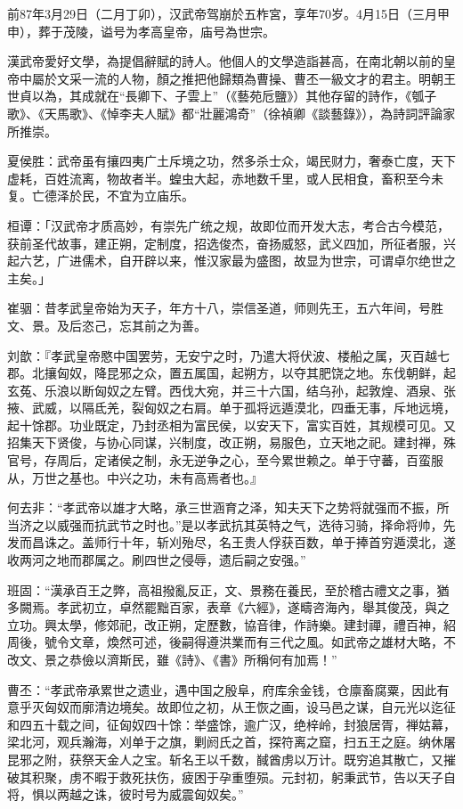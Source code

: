 前87年3月29日（二月丁卯），汉武帝驾崩於五柞宮，享年70岁。4月15日（三月甲申），葬于茂陵，谥号为孝高皇帝，庙号為世宗。

漢武帝愛好文學，為提倡辭賦的詩人。他個人的文學造詣甚高，在南北朝以前的皇帝中屬於文采一流的人物，顏之推把他歸類為曹操、曹丕一級文才的君主。明朝王世貞以為，其成就在“長卿下、子雲上”（《藝苑卮鹽》）其他存留的詩作，《瓠子歌》、《天馬歌》、《悼李夫人賦》都“壯麗鴻奇”（徐禎卿《談藝錄》），為詩詞評論家所推崇。

夏侯胜：武帝虽有攘四夷广土斥境之功，然多杀士众，竭民财力，奢泰亡度，天下虚耗，百姓流离，物故者半。蝗虫大起，赤地数千里，或人民相食，畜积至今未复。亡德泽於民，不宜为立庙乐。

桓谭：「汉武帝才质高妙，有崇先广统之规，故即位而开发大志，考合古今模范，获前圣代故事，建正朔，定制度，招选俊杰，奋扬威怒，武义四加，所征者服，兴起六艺，广进儒术，自开辟以来，惟汉家最为盛图，故显为世宗，可谓卓尔绝世之主矣。」

崔骃：昔孝武皇帝始为天子，年方十八，崇信圣道，师则先王，五六年间，号胜文、景。及后恣己，忘其前之为善。

刘歆：『孝武皇帝愍中国罢劳，无安宁之时，乃遣大将伏波、楼船之属，灭百越七郡。北攘匈奴，降昆邪之众，置五属国，起朔方，以夺其肥饶之地。东伐朝鲜，起玄菟、乐浪以断匈奴之左臂。西伐大宛，并三十六国，结乌孙，起敦煌、酒泉、张掖、武威，以隔氐羌，裂匈奴之右肩。单于孤将远遁漠北，四垂无事，斥地远境，起十馀郡。功业既定，乃封丞相为富民侯，以安天下，富实百姓，其规模可见。又招集天下贤俊，与协心同谋，兴制度，改正朔，易服色，立天地之祀。建封禅，殊官号，存周后，定诸侯之制，永无逆争之心，至今累世赖之。单于守蕃，百蛮服从，万世之基也。中兴之功，未有高焉者也。』

何去非：“孝武帝以雄才大略，承三世涵育之泽，知夫天下之势将就强而不振，所当济之以威强而抗武节之时也。”是以孝武抗其英特之气，选待习骑，择命将帅，先发而昌诛之。盖师行十年，斩刈殆尽，名王贵人俘获百数，单于捧首穷遁漠北，遂收两河之地而郡属之。刷四世之侵辱，遗后嗣之安强。”

班固：“漢承百王之弊，高祖撥亂反正，文、景務在養民，至於稽古禮文之事，猶多闕焉。孝武初立，卓然罷黜百家，表章《六經》，遂疇咨海內，舉其俊茂，與之立功。興太學，修郊祀，改正朔，定歷數，協音律，作詩樂。建封禪，禮百神，紹周後，號令文章，煥然可述，後嗣得遵洪業而有三代之風。如武帝之雄材大略，不改文、景之恭儉以濟斯民，雖《詩》、《書》所稱何有加焉！”

曹丕：“孝武帝承累世之遗业，遇中国之殷阜，府库余金钱，仓廪畜腐粟，因此有意乎灭匈奴而廓清边境矣。故即位之初，从王恢之画，设马邑之谋，自元光以迄征和四五十载之间，征匈奴四十馀：举盛馀，逾广汉，绝梓岭，封狼居胥，禅姑幕，梁北河，观兵瀚海，刈单于之旗，剿阏氏之首，探符离之窟，扫五王之庭。纳休屠昆邪之附，获祭天金人之宝。斩名王以千数，馘酋虏以万计。既穷追其散亡，又摧破其积聚，虏不暇于救死扶伤，疲困于孕重堕殒。元封初，躬秉武节，告以天子自将，惧以两越之诛，彼时号为威震匈奴矣。”

